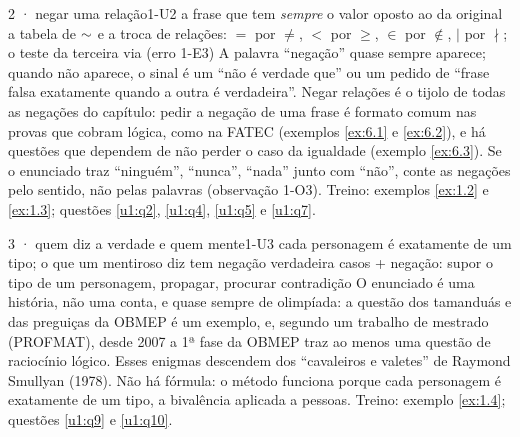 \begin{caso}{2 · negar uma relação}{1-U2}
{a frase que tem \emph{sempre} o valor oposto ao da original}
{a tabela de ${\sim}$ e a troca de relações: $=$ por $\neq$, $<$ por $\ge$, $\in$ por $\notin$, $\mid$ por $\nmid$; o teste da terceira via (erro 1-E3)}
\reconhecer A palavra \enquote{negação} quase sempre aparece; quando não aparece, o sinal é um \enquote{não é verdade que} ou um pedido de \enquote{frase falsa exatamente quando a outra é verdadeira}. Negar relações é o tijolo de todas as negações do capítulo: pedir a negação de uma frase é formato comum nas provas que cobram lógica, como na FATEC (exemplos \ref{ex:6.1} e \ref{ex:6.2}), e há questões que dependem de não perder o caso da igualdade (exemplo \ref{ex:6.3}). Se o enunciado traz \enquote{ninguém}, \enquote{nunca}, \enquote{nada} junto com \enquote{não}, conte as negações pelo sentido, não pelas palavras (observação 1-O3). Treino: exemplos \ref{ex:1.2} e \ref{ex:1.3}; questões \ref{u1:q2}, \ref{u1:q4}, \ref{u1:q5} e \ref{u1:q7}.
\end{caso}

\begin{caso}{3 · quem diz a verdade e quem mente}{1-U3}
{cada personagem é exatamente de um tipo; o que um mentiroso diz tem negação verdadeira}
{casos + negação: supor o tipo de um personagem, propagar, procurar contradição}
\reconhecer O enunciado é uma história, não uma conta, e quase sempre de olimpíada: a questão dos tamanduás e das preguiças da OBMEP é um exemplo, e, segundo um trabalho de mestrado (PROFMAT), desde 2007 a 1ª fase da OBMEP traz ao menos uma questão de raciocínio lógico. Esses enigmas descendem dos \enquote{cavaleiros e valetes} de Raymond Smullyan (1978). Não há fórmula: o método funciona porque cada personagem é exatamente de um tipo, a bivalência aplicada a pessoas. Treino: exemplo \ref{ex:1.4}; questões \ref{u1:q9} e \ref{u1:q10}.
\end{caso}

